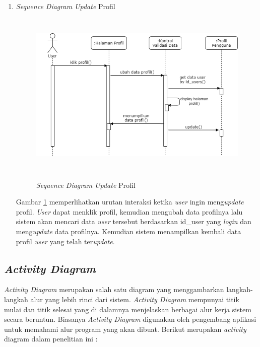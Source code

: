 \begin{enumerate}
	\newpage
	\item \textit{Sequence Diagram Update} Profil
	\begin{figure}[H]
		\centering
		{\includegraphics [width = 11cm, height= 8cm]{gambar/sequence/update profil}}
		\caption{\textit{Sequence Diagram Update} Profil}
		\label{seq profil}
	\end{figure}
	\par Gambar \ref*{seq profil} memperlihatkan urutan interaksi ketika \textit{user} ingin meng\textit{update} profil. \textit{User} dapat menklik profil, kemudian mengubah data profilnya lalu sistem akan mencari data \textit{user} tersebut berdasarkan id\_user yang \textit{login} dan meng\textit{update} data profilnya. Kemudian sistem menampilkan kembali data profil \textit{user} yang telah ter\textit{update}.
\end{enumerate}
	
\subsection{\textit{Activity Diagram}}
\textit{Activity Diagram} merupakan salah satu diagram yang menggambarkan langkah-langkah alur yang lebih rinci dari sistem. \textit{Activity Diagram} mempunyai titik mulai dan titik selesai yang di dalamnya menjelaskan berbagai alur kerja sistem secara beruntun. Biasanya \textit{Activity
Diagram} digunakan oleh pengembang aplikasi untuk memahami alur program yang akan dibuat. Berikut merupakan \textit{activity} diagram dalam penelitian ini :

\newpage

